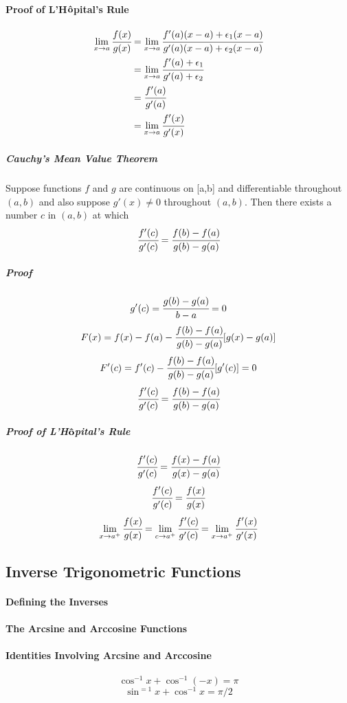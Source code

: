 \documentclass{article}
\begin{document}
            \paragraph{Proof of L'H$\bf{\hat{o}}$pital's Rule}
            \begin{equation}
                \begin{aligned}
                    \lim\limits_{x\to a}\cfrac{f(x)}{g(x)}&=\lim\limits_{x\to a}\cfrac{f'(a)(x-a)+\epsilon_1 (x-a)}{g'(a)(x-a)+\epsilon_2(x-a)}\\
                    &=\lim\limits_{x\to a} \cfrac{f'(a)+\epsilon_1}{g'(a)+\epsilon_2}\\
                    &=\cfrac{f'(a)}{g'(a)}\\
                    &=\lim\limits_{x\to a} \cfrac{f'(x)}{g'(x)}
                \end{aligned}                
            \end{equation}
                \subparagraph{Cauchy's Mean Value Theorem} Suppose functions $f$ and $g$ are continuous on [a,b] and differentiable throughout $(a,b)$ and also suppose $g'(x)\ne 0$ throughout $(a,b)$. Then there exists a number $c$ in $(a,b)$ at which
                \[\cfrac{f'(c)}{g'(c)}=\cfrac{f(b)-f(a)}{g(b)-g(a)}\]
                \subparagraph{Proof}
                \[g'(c)=\cfrac{g(b)-g(a)}{b-a}=0\]
                \[F(x)=f(x)-f(a)-\cfrac{f(b)-f(a)}{g(b)-g(a)}[g(x)-g(a)]\]
                \[F'(c)=f'(c)-\cfrac{f(b)-f(a)}{g(b)-g(a)}[g'(c)]=0\]
                \[\cfrac{f'(c)}{g'(c)}=\cfrac{f(b)-f(a)}{g(b)-g(a)}\]
                \subparagraph{Proof of L'H$\bf{\hat{o}}$pital's Rule}
                \[\cfrac{f'(c)}{g'(c)}=\cfrac{f(x)-f(a)}{g(x)-g(a)}\]
                \[\cfrac{f'(c)}{g'(c)}=\cfrac{f(x)}{g(x)}\]
                \[\lim\limits_{x\to a^+}\cfrac{f(x)}{g(x)}=\lim\limits_{c\to a^+}\cfrac{f'(c)}{g'(c)}=\lim\limits_{x\to a^+}\cfrac{f'(x)}{g'(x)}\]
        \subsection{Inverse Trigonometric Functions}
            \paragraph{Defining the Inverses}
            \paragraph{The Arcsine and Arccosine Functions}
            \paragraph{Identities Involving Arcsine and Arccosine}
            \[\cos^{-1}x+\cos^{-1}(-x)=\pi\]
            \[\sin^{=1}x+\cos^{-1}x=\pi/2\]
\end{document}
